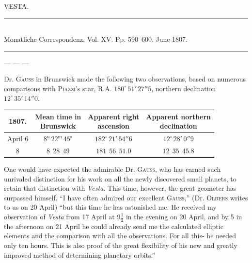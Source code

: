 \clearpage{}
\begin{center}
VESTA.
\end{center}

\begin{center}
\rule{0.6\linewidth}{0.4pt}\\
Monatliche Correspondenz. Vol. XV. Pp. 590–600. June 1807.\\
\rule{0.6\linewidth}{0.4pt}
\end{center}

--- --- ---

\par\indent Dr. \textsc{Gauss} in Brunswick made the following two observations, based on numerous comparisons with \textsc{Piazzi}’s star, R.A. $180^\circ\,51'\,27''5$, northern declination $12^\circ\,35'\,14''0$.

\begin{center}\begingroup
\fontsize{10}{12}\selectfont
\setlength{\tabcolsep}{2.5pt}\renewcommand{\arraystretch}{1.15}
\begin{tabular}{c|c|c|c}
1807. & \shortstack{Mean time in\\Brunswick} & \shortstack{Apparent right\\ascension \VestaRATwoNinety{}} & \shortstack{Apparent northern\\declination \VestaDecTwoNinety{}} \\ \hline
April 6 & $8^{\text{u}}\,22^{\text{m}}\,45^{\text{s}}$ & $182^\circ\,21'\,54''6$ & $12^\circ\,28'\,0''9$ \\
8 & $8\ \ 28\ \ 49$ & $181\ \ 56\ \ 51.0$ & $12\ \ 35\ \ 45.8$
\end{tabular}\endgroup\end{center}

\par\indent One would have expected the admirable Dr. \textsc{Gauss}, who has earned such unrivaled distinction for his work on all the newly discovered small planets, to retain that distinction with \emph{Vesta}. This time, however, the great geometer has surpassed himself. “I have often admired our excellent \textsc{Gauss},” (Dr. \textsc{Olbers} writes to us on 20 April) “but this time he has astonished me. He received my observation of \emph{Vesta} from 17 April at $9\tfrac{1}{2}$ in the evening on 20 April, and by 5 in the afternoon on 21 April he could already send me the calculated elliptic elements and the comparison with all the observations. For all this-
%
he needed only ten hours. This is also proof of the great flexibility of his new and greatly improved method of determining planetary orbits.”

